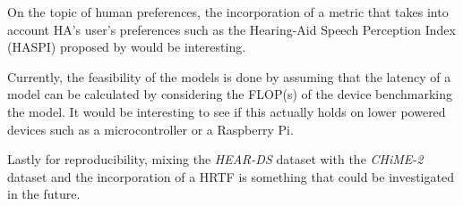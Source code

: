 \documentclass[logo,bsc,singlespacing,parskip,online]{infthesis}
\newcommand{\heards}{\textit{HEAR-DS}\xspace}
\newcommand{\chime}[1]{\textit{CHiME-#1}\xspace}
\begin{document}
On the topic of human preferences, 
the incorporation of a metric 
that takes into account HA's user's preferences
such as the Hearing-Aid Speech Perception Index (HASPI)
proposed by \citet{Kates2021HASPI} would be interesting.

Currently, the feasibility of the models is done by 
assuming that the latency of a model can be 
calculated by considering the FLOP(s) of the device 
benchmarking the model. It would be interesting to see 
if this actually holds on lower powered devices 
such as a microcontroller or a Raspberry Pi.

Lastly for reproducibility, mixing the \heards dataset 
with the \chime{2} dataset and the incorporation of 
a HRTF is something that could be investigated in the future.













\end{document}
